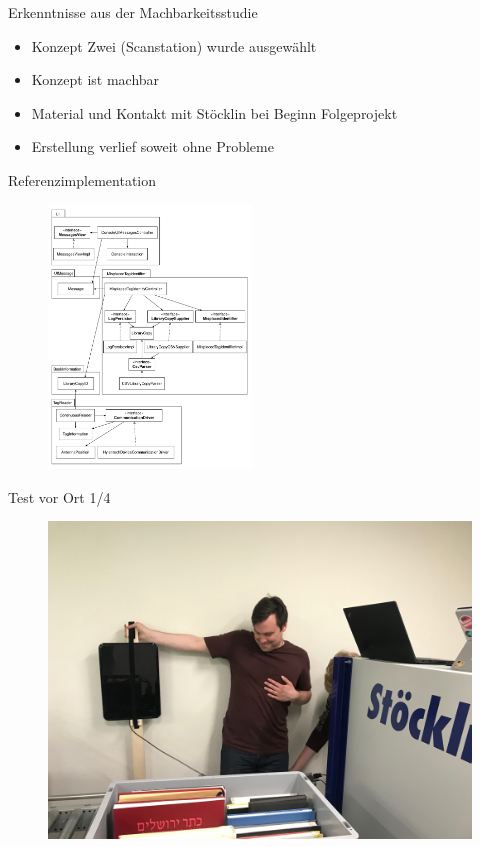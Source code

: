 \documentclass{beamer}
\begin{document}
\begin{frame}{Erkenntnisse aus der Machbarkeitsstudie}
\begin{itemize}
    \item Konzept Zwei (Scanstation) wurde ausgewählt
    \item Konzept ist machbar
    \item Material und Kontakt mit Stöcklin bei Beginn Folgeprojekt
    \item Erstellung verlief soweit ohne Probleme
\end{itemize}
\end{frame}
\begin{frame}{Referenzimplementation}
\begin{figure}[tbh!]
    \centering
    \includegraphics[height=7cm]{img/TestApplikation}
    \label{fig:testapplikation}
\end{figure}
\end{frame}
\begin{frame}{Test vor Ort 1/4}
\begin{figure}[tbh!]
    \centering
    \includegraphics[width=0.8\linewidth]{img/Versuchsaufbau_02}    \label{fig:versuchsaufbau02}
\end{figure}
\end{frame}
\end{document}
